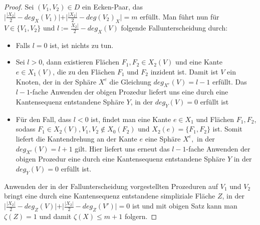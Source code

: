 \documentclass[12pt,titlepage,twoside,cleardoublepage]{article}
\theoremstyle{nummermitklammern}
\numberwithin{equation}{section}
\begin{document}
\begin{proof}
Sei $(V_1,V_2)\in D$ ein Ecken-Paar, das 
$\vert\frac{\vert X_2 \vert}{2}-deg_X(V_1)\vert +\vert \frac{\vert X_2 \vert}{2}-deg(V_2)_X\vert=m$ erfüllt.
Man führt nun für $V \in \{V_1,V_2\}$ und $l:=\frac{X_2 \vert}{2}-deg_X(V)$ folgende Fallunterscheidung durch:
\begin{itemize}
\item Falls $l=0$ ist, ist nichts zu tun.
\item Sei $l>0$, dann existieren Flächen $F_1,F_2 \in X_2(V)$ und eine Kante $e\in X_1(V)$, die zu den Flächen $F_1$ und $F_2$ inzident ist. Damit ist $V$ ein Knoten, der in der Sphäre $X^e$ die Gleichung $deg_{X^e}(V)=l-1$ erfüllt. Das $l-1$-fache Anwenden der obigen Prozedur liefert uns eine durch eine Kantensequenz entstandene Sphäre $Y$, in der  $deg_Y(V)=0$ erfüllt ist 
 \item Für den Fall, dass $l<0$ ist, findet man eine Kante $e\in X_1$ und Flächen $F_1,F_2$, sodass $F_1\in X_2(V),V_1,V_2 \notin X_0(F_2)$ und $X_2(e)=\{F_1,F_2\}$ ist. Somit liefert die Kantendrehung an der Kante $e$ eine Sphäre $X^e,$ in der $deg_{X^e}(V)=l+1$ gilt. Hier liefert uns erneut das $l-1$-fache Anwenden der obigen Prozedur eine durch eine Kantensequenz entstandene Sphäre $Y$ in der  $deg_Y(V)=0$ erfüllt ist.
\end{itemize}  
 Anwenden der in der Fallunterscheidung vorgestellten Prozeduren auf $V_1$ und $V_2$ bringt eine durch eine Kantensequenz entstandene simpliziale Fläche $Z$, in der $\vert\frac{\vert X_2 \vert}{2}-deg_Z(V)\vert +\vert \frac{\vert X_2 \vert}{2}-deg_Z(V')\vert=0$ ist und mit obigen Satz kann man $\zeta(Z)=1$ und damit $\zeta(X)\leq m+1$ folgern. 
\end{proof}
\end{document}
